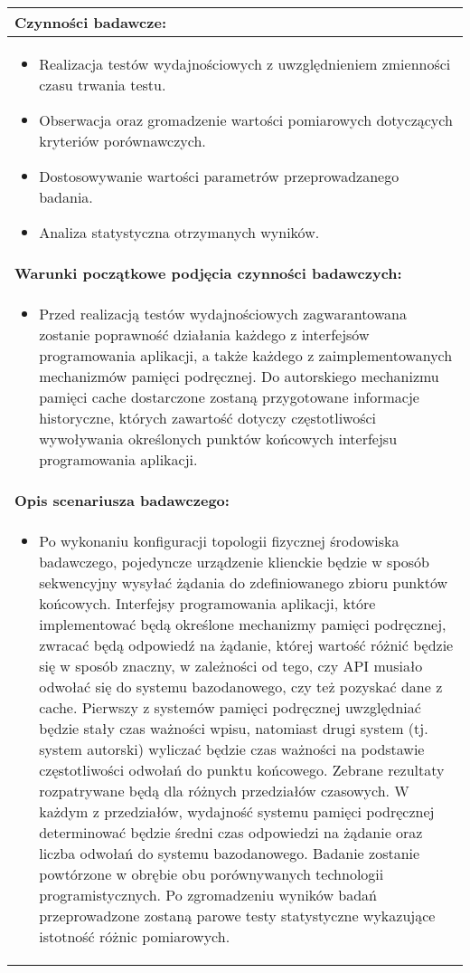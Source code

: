 \begin{longtable}[c]{|llll|}
    \multicolumn{4}{|l|}{\textbf{Czynności badawcze:}}                               \\ \hline
    \multicolumn{4}{|p{\linewidth}|}{
        \begin{itemize}
            \item Realizacja testów wydajnościowych z uwzględnieniem zmienności czasu trwania testu.
            \item Obserwacja oraz gromadzenie wartości pomiarowych dotyczących kryteriów porównawczych.
            \item Dostosowywanie wartości parametrów przeprowadzanego badania.
            \item Analiza statystyczna otrzymanych wyników.
        \end{itemize}
    }                                                           \\ \hline
    \multicolumn{4}{|l|}{\textbf{Warunki początkowe podjęcia czynności badawczych:}} \\ \hline
    \multicolumn{4}{|p{\linewidth}|}{
        \begin{itemize}[label={}]
            \item Przed realizacją testów wydajnościowych zagwarantowana zostanie poprawność działania każdego z interfejsów programowania aplikacji, a także każdego z zaimplementowanych mechanizmów pamięci podręcznej. Do autorskiego mechanizmu pamięci cache dostarczone zostaną przygotowane informacje historyczne, których zawartość dotyczy częstotliwości wywoływania określonych punktów końcowych interfejsu programowania aplikacji.  
          \end{itemize}
    }                                                           \\ \hline
    \multicolumn{4}{|l|}{\textbf{Opis scenariusza badawczego:}}                      \\ \hline
    \multicolumn{4}{|p{\linewidth}|}{
        \begin{itemize}[label={}]
            \item Po wykonaniu konfiguracji topologii fizycznej środowiska badawczego, pojedyncze urządzenie klienckie będzie w sposób sekwencyjny wysyłać żądania do zdefiniowanego zbioru punktów końcowych. Interfejsy programowania aplikacji, które implementować będą określone mechanizmy pamięci podręcznej, zwracać będą odpowiedź na żądanie, której wartość różnić będzie się w sposób znaczny, w zależności od tego, czy API musiało odwołać się do systemu bazodanowego, czy też pozyskać dane z cache. Pierwszy z systemów pamięci podręcznej uwzględniać będzie stały czas ważności wpisu, natomiast drugi system (tj. system autorski) wyliczać będzie czas ważności na podstawie częstotliwości odwołań do punktu końcowego. Zebrane rezultaty rozpatrywane będą dla różnych przedziałów czasowych. W każdym z przedziałów, wydajność systemu pamięci podręcznej determinować będzie średni czas odpowiedzi na żądanie oraz liczba odwołań do systemu bazodanowego. Badanie zostanie powtórzone w obrębie obu porównywanych technologii programistycznych. Po zgromadzeniu wyników badań przeprowadzone zostaną parowe testy statystyczne wykazujące istotność różnic pomiarowych.

\end{itemize}}
\end{longtable}
